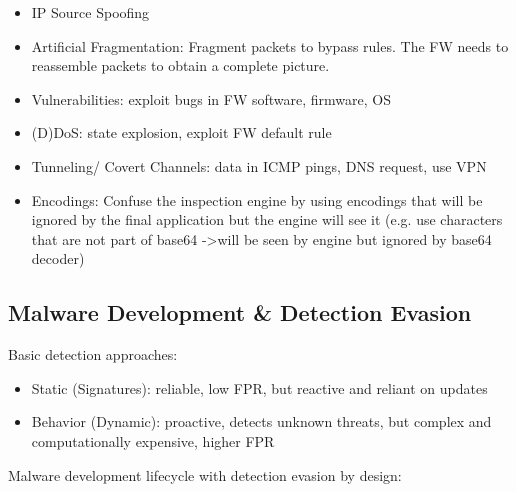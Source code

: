 \documentclass[11pt,oneside,a4paper]{article}
\begin{document}
\vspace{-\topsep}
\begin{itemize}
	\setlength{\itemsep}{0pt}
	\setlength{\parskip}{0pt}
	\item IP Source Spoofing
	\item Artificial Fragmentation: Fragment packets to bypass rules. The FW needs to reassemble packets to obtain a complete picture.
	\item Vulnerabilities: exploit bugs in FW software, firmware, OS
	\item (D)DoS: state explosion, exploit FW default rule
	\item Tunneling/ Covert Channels: data in ICMP pings, DNS request, use VPN
	\item Encodings: Confuse the inspection engine by using encodings that will be ignored by the final application but the engine will see it (e.g. use characters that are not part of base64 -\textgreater will be seen by engine but ignored by base64 decoder)
\end{itemize}
\vspace{-\topsep}

\subsection{Malware Development	\& Detection Evasion}

Basic detection approaches:

\vspace{-\topsep}
\begin{itemize}
	\setlength{\itemsep}{0pt}
	\setlength{\parskip}{0pt}
	\item Static (Signatures): reliable, low FPR, but reactive and reliant on updates
	\item Behavior (Dynamic): proactive, detects unknown threats, but complex and computationally expensive, higher FPR
\end{itemize}
\vspace{-\topsep}

Malware development lifecycle with detection evasion by design:
\end{document}
